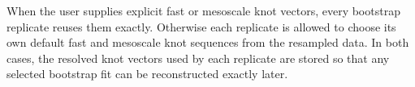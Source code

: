 \documentclass{article}
\begin{document}
When the user supplies explicit fast or mesoscale knot vectors, every
bootstrap replicate reuses them exactly. Otherwise each replicate is
allowed to choose its own default fast and mesoscale knot sequences from
the resampled data. In both cases, the resolved knot vectors used by each
replicate are stored so that any selected bootstrap fit can be
reconstructed exactly later.
\end{document}
